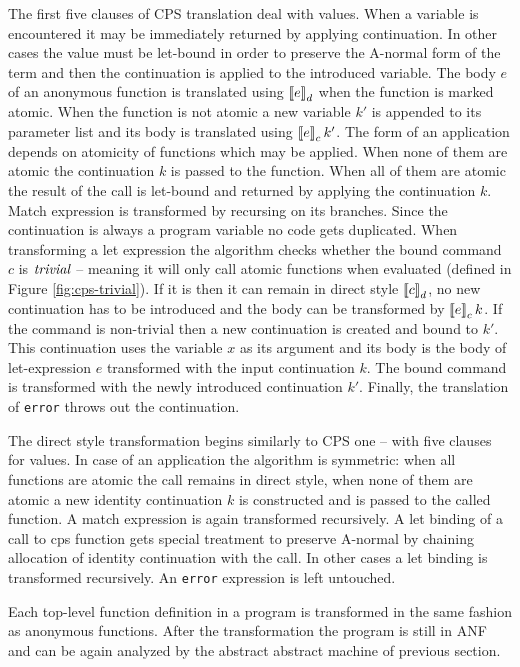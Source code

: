 The first five clauses of CPS translation deal with values.
When a variable is encountered it may be immediately returned by applying continuation.
In other cases the value must be let-bound in order to preserve the A-normal form of the term and then the continuation is applied to the introduced variable.
The body $e$ of an anonymous function is translated using $\left\llbracket e \right\rrbracket_d$ when the function is marked atomic.
When the function is not atomic a new variable $k'$ is appended to its parameter list and its body is translated using $\left\llbracket e \right\rrbracket_c k'$.
The form of an application depends on atomicity of functions which may be applied.
When none of them are atomic the continuation $k$ is passed to the function.
When all of them are atomic the result of the call is let-bound and returned by applying the continuation $k$.
Match expression is transformed by recursing on its branches.
Since the continuation is always a program variable no code gets duplicated.
When transforming a let expression the algorithm checks whether the bound command $c$ is $\mathit{trivial}$ -- meaning it will only call atomic functions when evaluated (defined in Figure \ref{fig:cps-trivial}).
If it is then it can remain in direct style $\left\llbracket c \right\rrbracket_d$, no new continuation has to be introduced and the body can be transformed by $\left\llbracket e \right\rrbracket_c k$.
If the command is non-trivial then a new continuation is created and bound to $k'$.
This continuation uses the variable $x$ as its argument and its body is the body of let-expression $e$ transformed with the input continuation $k$.
The bound command is transformed with the newly introduced continuation $k'$.
Finally, the translation of \lstinline!error! throws out the continuation.

The direct style transformation begins similarly to CPS one -- with five clauses for values.
In case of an application the algorithm is symmetric: when all functions are atomic the call remains in direct style, when none of them are atomic a new identity continuation $k$ is constructed and is passed to the called function.
A match expression is again transformed recursively.
A let binding of a call to cps function gets special treatment to preserve A-normal by chaining allocation of identity continuation with the call.
In other cases a let binding is transformed recursively.
An \lstinline!error! expression is left untouched.

Each top-level function definition in a program is transformed in the same fashion as anonymous functions.
After the transformation the program is still in ANF and can be again analyzed by the abstract abstract machine of previous section. 



